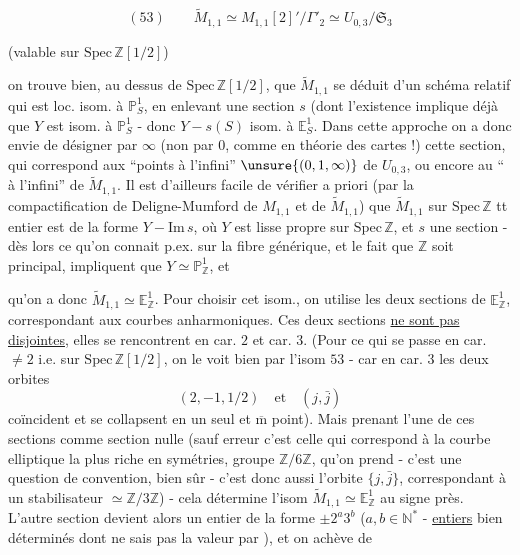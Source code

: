 
\[
(53)\qquad
\widetilde M_{1,1}\simeq M_{1,1}[2]'/\Gamma'_2
\simeq U_{0,3}/\mathfrak S_3
\]

\qquad
(valable sur $\mathrm{Spec}\,\mathbb Z[1/2]$)

on trouve bien, au dessus de $\mathrm{Spec}\,\mathbb Z[1/2]$, que
$\widetilde M_{1,1}$ se déduit d'un schéma relatif  qui est
 loc.  isom. à $\mathbb P^1_S$,
en enlevant une section $s$ (dont l'existence implique déjà que $Y$ est
 isom. à $\mathbb P^1_S$ - donc
$Y-s(S)$ isom. à $\mathbb E^1_S$.
Dans cette approche on a donc envie de désigner par $\infty$
(non par $0$, comme en théorie des cartes !) cette section,
qui correspond aux ``points à l'infini'' $\unsure{(0,1,\infty)}$ de
$U_{0,3}$, ou encore au `` à l'infini'' de
$\widetilde M_{1,1}$.
Il est d'ailleurs facile de vérifier a priori 
(par la compactification de Deligne-Mumford de $M_{1,1}$ et de
$\widetilde M_{1,1}$) que $\widetilde M_{1,1}$ sur $\mathrm{Spec}\,\mathbb Z$
tt entier est de la forme $Y-\mathrm{Im}\,s$, où $Y$ est lisse propre
sur $\mathrm{Spec}\,\mathbb Z$, et $s$ une section - dès lors ce qu'on
connait p.ex. sur la fibre générique, et le fait que $\mathbb Z$ soit
principal, impliquent que $Y\simeq\mathbb P^1_{\mathbb Z}$, et


qu'on a donc $\widetilde M_{1,1}\simeq\mathbb E^1_{\mathbb Z}$.
Pour  choisir cet isom., on utilise les deux sections de
$\mathbb E^1_{\mathbb Z}$, correspondant aux courbes anharmoniques.
Ces deux sections \uline{ne sont pas} \uline{disjointes}, elles se
rencontrent en car. $2$ et car. $3$.
(Pour ce qui se passe en car. $\ne 2$ i.e. sur
$\mathrm{Spec}\,\mathbb Z[1/2]$, on le voit bien par l'isom $53$ -
 car en car. $3$ les deux orbites
\[
(2,-1,1/2)\quad\text{et}\quad(j,\bar j)
\]
coïncident et se collapsent en un seul et
$\overline{\mathrm m}$ point).
Mais prenant l'une de ces sections comme section nulle
(sauf erreur c'est celle qui correspond à la courbe elliptique la plus
riche en symétries,   groupe $\mathbb Z/6\mathbb Z$, qu'on prend -
c'est une question de convention, bien sûr - c'est donc aussi l'orbite
$\{j,\bar j\}$, correspondant à un stabilisateur
$\simeq\mathbb Z/3\mathbb Z$) - cela détermine l'isom
$\widetilde M_{1,1}\simeq\mathbb E^1_{\mathbb Z}$ au signe près.
L'autre section devient alors un entier de la forme
$\pm 2^a3^b$ ($a,b\in\mathbb N^*$ - \uline{entiers} bien déterminés dont
 ne sais pas la valeur par ), et on achève de

